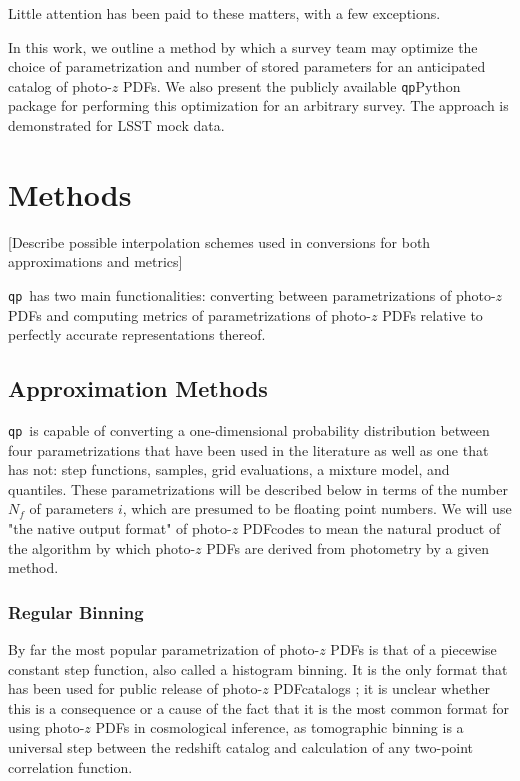\documentclass[\docopts]{\docclass}
\newcommand{\qp}{\texttt{qp}}
\newcommand{\pz}{photo-$z$ PDF}
\begin{document}
Little attention has been paid to these matters, with a few exceptions.  
\citep{carrasco_kind_sparse_2014}

In this work, we outline a method by which a survey team may optimize the 
choice of parametrization and number of stored parameters for an anticipated 
catalog of \pz s.  We also present the publicly available \qp Python package 
for performing this optimization for an arbitrary survey.  The approach is 
demonstrated for LSST mock data.








\section{Methods}
\label{sec:methods}

[Describe possible interpolation schemes used in conversions for both 
approximations and metrics]


\qp\ has two main functionalities: converting between parametrizations of \pz s 
and computing metrics of parametrizations of \pz s relative to perfectly 
accurate representations thereof.

\subsection{Approximation Methods}
\label{sec:approx}


\qp\ is capable of converting a one-dimensional probability distribution 
between four parametrizations that have been used in the literature as well as 
one that has not: step functions, samples, grid evaluations, a mixture model, 
and quantiles.  These parametrizations will be described below in terms of the 
number $N_{f}$ of parameters $i$, which are presumed to be floating point 
numbers.  We will use "the native output format" of \pz  codes to mean the 
natural product of the algorithm by which \pz s are derived from photometry by 
a given method.


\subsubsection{Regular Binning}
\label{sec:bins}

By far the most popular parametrization of \pz s is that of a piecewise 
constant step function, also called a histogram binning.  It is the only format 
that has been used for public release of \pz  catalogs 
\citep{tanaka_photometric_2017, sheldon_photometric_2012}; it is unclear 
whether this is a consequence or a cause of the fact that it is the most common 
format for using \pz s in cosmological inference, as tomographic binning is a 
universal step between the redshift catalog and calculation of any two-point 
correlation function.
\end{document}
